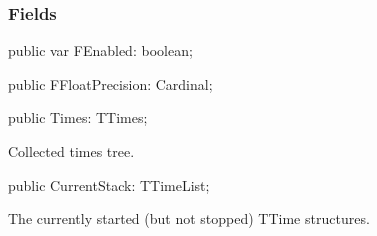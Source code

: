 \documentclass{report}
\newif\ifpdf
\begin{document}
\subsubsection*{\large{\textbf{Fields}}\normalsize\hspace{1ex}\hfill}
\begin{list}{}{
\setlength{\itemindent}{0cm}
\setlength{\listparindent}{0cm}
\setlength{\leftmargin}{\evensidemargin}
\addtolength{\leftmargin}{\tmplength}
\settowidth{\labelsep}{X}
\addtolength{\leftmargin}{\labelsep}
\setlength{\labelwidth}{\tmplength}
}
\label{ok_nested_2.TCastleProfiler-FEnabled}
\item[\textbf{FEnabled}\hfill]
\ifpdf
\begin{flushleft}
\fi
\begin{ttfamily}
public var FEnabled: boolean;\end{ttfamily}

\ifpdf
\end{flushleft}
\fi


\par  \label{ok_nested_2.TCastleProfiler-FFloatPrecision}
\item[\textbf{FFloatPrecision}\hfill]
\ifpdf
\begin{flushleft}
\fi
\begin{ttfamily}
public FFloatPrecision: Cardinal;\end{ttfamily}

\ifpdf
\end{flushleft}
\fi


\par  \label{ok_nested_2.TCastleProfiler-Times}
\item[\textbf{Times}\hfill]
\ifpdf
\begin{flushleft}
\fi
\begin{ttfamily}
public Times: TTimes;\end{ttfamily}

\ifpdf
\end{flushleft}
\fi


\par Collected times tree.\label{ok_nested_2.TCastleProfiler-CurrentStack}
\item[\textbf{CurrentStack}\hfill]
\ifpdf
\begin{flushleft}
\fi
\begin{ttfamily}
public CurrentStack: TTimeList;\end{ttfamily}

\ifpdf
\end{flushleft}
\fi


\par The currently started (but not stopped) TTime structures.\end{list}
\end{document}
